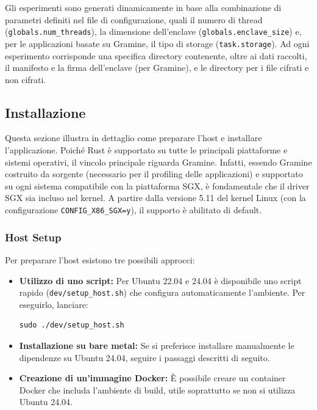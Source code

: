 \documentclass{article}
\begin{document}
Gli esperimenti sono generati dinamicamente in base alla combinazione di parametri definiti nel file di configurazione, quali il numero di thread (\texttt{globals.num\_threads}), la dimensione dell'enclave (\texttt{globals.enclave\_size}) e, per le applicazioni basate su Gramine, il tipo di storage (\texttt{task.storage}). Ad ogni esperimento corrisponde una specifica directory contenente, oltre ai dati raccolti, il manifesto e la firma dell'enclave (per Gramine), e le directory per i file cifrati e non cifrati.

\subsection{Installazione}
Questa sezione illustra in dettaglio come preparare l'host e installare l'applicazione. Poiché Rust è supportato su tutte le principali piattaforme e sistemi operativi, il vincolo principale riguarda Gramine. Infatti, essendo Gramine costruito da sorgente (necessario per il profiling delle applicazioni) e supportato su ogni sistema compatibile con la piattaforma SGX, è fondamentale che il driver SGX sia incluso nel kernel. A partire dalla versione 5.11 del kernel Linux (con la configurazione \texttt{CONFIG\_X86\_SGX=y}), il supporto è abilitato di default.

\subsubsection{Host Setup}
Per preparare l'host esistono tre possibili approcci:

\begin{itemize}
  \item \textbf{Utilizzo di uno script:} Per Ubuntu 22.04 e 24.04 è disponibile uno script rapido (\texttt{dev/setup\_host.sh}) che configura automaticamente l'ambiente. Per eseguirlo, lanciare:
  \begin{verbatim}
sudo ./dev/setup_host.sh
  \end{verbatim}

  \item \textbf{Installazione su bare metal:} Se si preferisce installare manualmente le dipendenze su Ubuntu 24.04, seguire i passaggi descritti di seguito.

  \item \textbf{Creazione di un'immagine Docker:} È possibile creare un container Docker che includa l'ambiente di build, utile soprattutto se non si utilizza Ubuntu 24.04.
\end{itemize}
\end{document}
